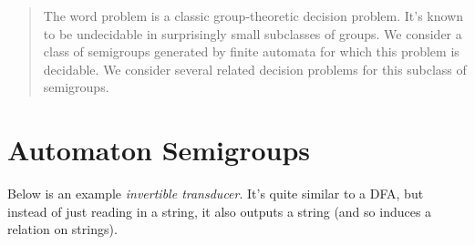 \documentclass[a0]{a0poster}
\theoremstyle{pleasant}
\newcommand{\0}{\underline{0}}
\newcommand{\1}{\underline{1}}
\newcommand{\2}{\underline{2}}
\begin{document}
\begin{multicols}{3} %



\begin{abstract}
\large
The word problem is a classic group-theoretic decision problem. It's known to be undecidable in surprisingly small subclasses of groups. We consider a class of semigroups generated by finite automata for which this problem is decidable. We consider several related decision problems for this subclass of semigroups.
\end{abstract}



\section*{Automaton Semigroups}

\Large
Below is an example \textit{invertible transducer}. It's quite similar to a DFA, but instead of just reading in a string, it also outputs a string (and so induces a relation on strings).


\end{multicols}
\end{document}
